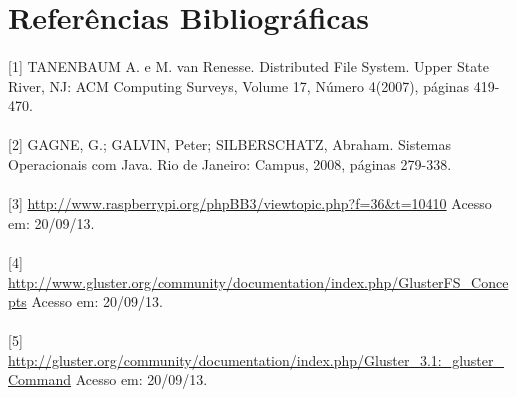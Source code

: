 \section{Referências Bibliográficas}
\paragraph{}[1] TANENBAUM A. e M. van Renesse. Distributed File System. Upper State River, NJ: ACM Computing Surveys, Volume 17, Número 4(2007), páginas 419-470.
\paragraph{}[2] GAGNE, G.; GALVIN, Peter; SILBERSCHATZ, Abraham. Sistemas Operacionais com Java. Rio de Janeiro: Campus, 2008, páginas 279-338.
\paragraph{}[3] \url{http://www.raspberrypi.org/phpBB3/viewtopic.php?f=36&t=10410} Acesso em: 20/09/13.
\paragraph{}[4] \url{http://www.gluster.org/community/documentation/index.php/GlusterFS_Concepts} Acesso em: 20/09/13.
\paragraph{}[5] \url{http://gluster.org/community/documentation/index.php/Gluster_3.1:_gluster_Command} Acesso em: 20/09/13.

